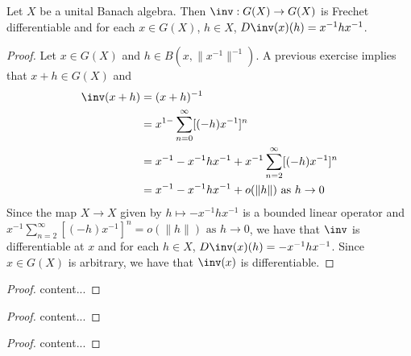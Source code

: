 \documentclass{book}
\begin{document}
\begin{ex}
	Let $X$ be a unital Banach algebra. Then $\inv: G(X) \rightarrow G(X)$ is Frechet differentiable and for each $x \in G(X)$, $h \in X$,  $D \inv(x)(h) = x^{-1}hx^{-1}$.
\end{ex}

\begin{proof}
	Let $x \in G(X)$ and $h \in B(x, \|x^{-1}\|^{-1})$. A previous exercise implies that $x + h \in G(X)$ and 
	\begin{align*}
		\inv(x+h) 
		& = (x+h)^{-1} \\
		& = x^{1-} \sum_{n=0}^{\infty} [(-h) x^{-1}]^n \\
		& = x^{-1} - x^{-1}hx^{-1} + x^{-1}\sum_{n=2}^{\infty} [(-h) x^{-1}]^n \\
		& = x^{-1} - x^{-1}hx^{-1} + o(\|h\|) \text{ as $h \rightarrow 0$}
	\end{align*}
	Since the map $X \rightarrow X$ given by $h \mapsto - x^{-1}hx^{-1}$ is a bounded linear operator and  $x^{-1}\sum\limits_{n=2}^{\infty} [(-h) x^{-1}]^n = o(\|h\|) \text{ as $h \rightarrow 0$}$, we have that $\inv$ is differentiable at $x$ and for each $h \in X$, $D\inv(x)(h) = - x^{-1}hx^{-1}$. Since $x \in G(X)$ is arbitrary, we have that $\inv(x)$ is differentiable. 
\end{proof}


\begin{ex}
	
\end{ex}

\begin{proof}
	content...
\end{proof}

\begin{ex}
	
\end{ex}

\begin{proof}
	content...
\end{proof}


\begin{ex}
	
\end{ex}

\begin{proof}
	content...
\end{proof}
\end{document}
